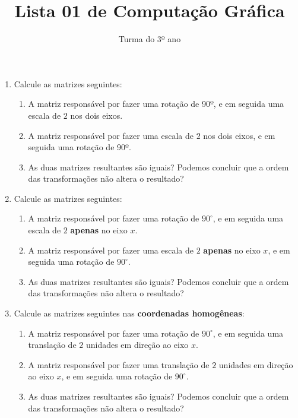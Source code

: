 \documentclass[12pt]{article}
\title{Lista 01 de Computação Gráfica}
\date{}
\author{Turma do 3º ano}
\begin{document}
\maketitle

\begin{enumerate}


\item Calcule as matrizes seguintes:

\begin{enumerate}

\item A matriz responsável por fazer uma rotação de 90º, e em seguida uma escala de $2$ nos dois eixos.

\item A matriz responsável por fazer uma escala de $2$ nos dois eixos, e em seguida uma rotação de 90º.

\item As duas matrizes resultantes são iguais? Podemos concluir que a ordem das transformações não altera o resultado?

\end{enumerate}

\item Calcule as matrizes seguintes:

\begin{enumerate}

\item A matriz responsável por fazer uma rotação de $90^\circ$, e em seguida uma escala de $2$ \textbf{apenas} no eixo $x$.

\item A matriz responsável por fazer uma escala de $2$ \textbf{apenas} no eixo $x$, e em seguida uma rotação de $90^\circ$.

\item As duas matrizes resultantes são iguais? Podemos concluir que a ordem das transformações não altera o resultado?

\end{enumerate}

\item Calcule as matrizes seguintes nas \textbf{coordenadas homogêneas}:

\begin{enumerate}

\item A matriz responsável por fazer uma rotação de $90^\circ$, e em seguida uma translação de $2$ unidades em direção ao eixo $x$.

\item A matriz responsável por fazer uma translação de $2$ unidades em direção ao eixo $x$, e em seguida uma rotação de $90^\circ$.

\item As duas matrizes resultantes são iguais? Podemos concluir que a ordem das transformações não altera o resultado?

\end{enumerate}


\end{enumerate}
\end{document}
